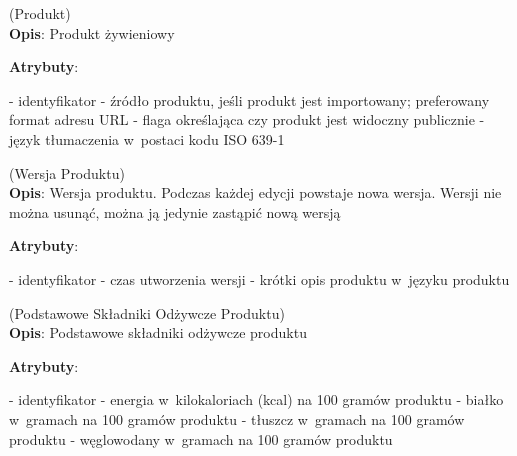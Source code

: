 \begin{enumerate}[label={\textbf{KAT/1/\protect\twodigits{\theenumi}}}, wide, labelwidth=!, labelindent=0pt, labelsep=0pt, series=reqs]
    \setlength\itemsep{1.75em}
    \label{kat:Product} (Produkt)\\
    \indent\textbf{Opis}: Produkt żywieniowy
    \par
    \textbf{Atrybuty}:
    \begin{itemize}[series=atr, wide, align=left, leftmargin=190pt]
        \label{kat:Product:id}- identyfikator
        \label{kat:Product:source}- źródło produktu, jeśli produkt jest importowany; preferowany format adresu URL
        \label{kat:Product:isPublic}- flaga określająca czy produkt jest widoczny publicznie
        \label{kat:Product:language}- język tłumaczenia w~postaci kodu ISO 639-1
    \end{itemize}

    \label{kat:ProductVersion} (Wersja Produktu)\\
    \indent\textbf{Opis}: Wersja produktu. Podczas każdej edycji powstaje nowa wersja. Wersji nie można usunąć, można ją jedynie zastąpić nową wersją
    \par
    \textbf{Atrybuty}:
    \begin{itemize}[series=atr, wide, align=left, leftmargin=190pt]
        \label{kat:ProductVersion:id}- identyfikator
        \label{kat:ProductVersion:createdDate}- czas utworzenia wersji
        \label{kat:ProductVersion:description}- krótki opis produktu w~języku produktu
    \end{itemize}

    \label{kat:ProductBasicNutritionData} (Podstawowe Składniki Odżywcze Produktu)\\
    \indent\textbf{Opis}: Podstawowe składniki odżywcze produktu
    \par
    \textbf{Atrybuty}:
    \begin{itemize}[series=atr, wide, align=left, leftmargin=190pt]
        \label{kat:ProductBasicNutritionData:id}- identyfikator
        \label{kat:ProductBasicNutritionData:energy}- energia w~kilokaloriach (kcal) na 100 gramów produktu
        \label{kat:ProductBasicNutritionData:protein}- białko w~gramach na 100 gramów produktu
        \label{kat:ProductBasicNutritionData:fat}- tłuszcz w~gramach na 100 gramów produktu
        \label{kat:ProductBasicNutritionData:carbohydrates}- węglowodany w~gramach na 100 gramów produktu
    \end{itemize}


\end{enumerate}

